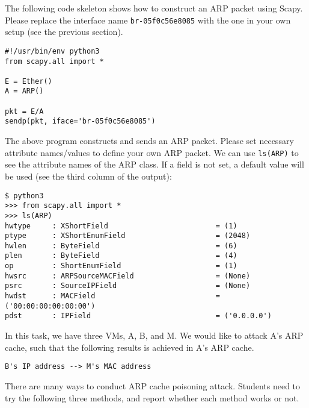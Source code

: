 The following code skeleton shows how to construct an ARP packet using Scapy. 
Please replace the interface name \texttt{br-05f0c56e8085} with the one in your 
own setup (see the previous section). 

\begin{lstlisting}
#!/usr/bin/env python3
from scapy.all import *

E = Ether()
A = ARP()

pkt = E/A
sendp(pkt, iface='br-05f0c56e8085')
\end{lstlisting}

The above program constructs and sends an ARP packet. Please set necessary attribute
names/values to define your own ARP packet. We can use \texttt{ls(ARP)} to see the attribute
names of the ARP class. If a field is not set, a default value will be used (see the third
column of the output):

\begin{lstlisting}
$ python3
>>> from scapy.all import *
>>> ls(ARP)
hwtype     : XShortField                         = (1)
ptype      : XShortEnumField                     = (2048)
hwlen      : ByteField                           = (6)
plen       : ByteField                           = (4)
op         : ShortEnumField                      = (1)
hwsrc      : ARPSourceMACField                   = (None)
psrc       : SourceIPField                       = (None)
hwdst      : MACField                            = ('00:00:00:00:00:00')
pdst       : IPField                             = ('0.0.0.0')
\end{lstlisting}

In this task, we have three VMs, A, B, and M. We would like to attack A's ARP cache, such that
the following results is achieved in A's ARP cache. 

\begin{lstlisting}
B's IP address --> M's MAC address
\end{lstlisting}

There are many ways to conduct ARP cache poisoning attack. Students need to try the following
three methods, and report whether each method works or not.

